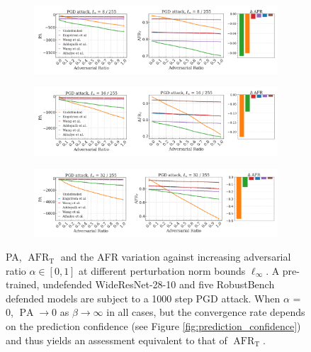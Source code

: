\begin{figure}[H]
    \centering
    \begin{subfigure}[b]{\textwidth}
        \centering
        \includegraphics[width=\textwidth]{img/results_discussion/adversarial/PGD_0.0314_combo.png}
    \end{subfigure}

    \vspace{1em}

    \begin{subfigure}[b]{\textwidth}
        \centering
        \includegraphics[width=\textwidth]{img/results_discussion/adversarial/PGD_0.0627_combo.png}
    \end{subfigure}

    \vspace{1em}

    \begin{subfigure}[b]{\textwidth}
        \centering
        \includegraphics[width=\textwidth]{img/results_discussion/adversarial/PGD_0.1255_combo.png}
    \end{subfigure}

    \caption{PA, $\operatorname{AFR}_\text{T}$ and the AFR variation against increasing adversarial ratio $\alpha \in [0,1]$ at different
    perturbation norm bounds $\ell_\infty$. A pre-trained, undefended WideResNet-28-10
    and five RobustBench \cite{croceRobustBenchStandardizedAdversarial2021a}
    defended models are subject to a 1000 step PGD attack.
    When $\alpha$ = 0, $\operatorname{PA} \longrightarrow 0$ as $\beta \longrightarrow \infty$ in all cases, but
    the convergence rate depends on the prediction confidence (see Figure \ref{fig:prediction_confidence}) and thus yields an assessment equivalent to that
    of $\operatorname{AFR}_\text{T}$.
    }
    \label{fig:six_figures_pa_adv}
\end{figure}

